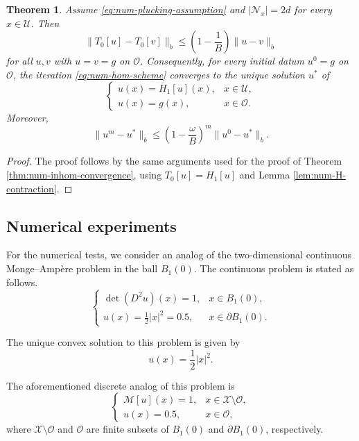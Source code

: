 \documentclass[reqno,11pt]{amsart}
\numberwithin{equation}{section}
\newtheorem{theorem}{Theorem}[section]
\theoremstyle{definition}
\theoremstyle{remark}
\begin{document}
\begin{theorem}\label{thm:num-hom-convergence}
Assume \eqref{eq:num-plucking-assumption} and \(|\mathcal N_x|=2d\) for every \(x\in \mathcal{U}\). Then
\[
    \|T_0[u]-T_0[v]\|_b
    \le
    \left(1-\frac1B\right)\|u-v\|_b
\]
for all \(u,v\) with \(u=v=g\) on \(\mathcal O\). Consequently, for every initial datum \(u^0=g\) on \(\mathcal O\), the iteration \eqref{eq:num-hom-scheme} converges to the unique solution \(u^\ast\) of
\[
    \begin{cases}
    u(x)=H_1[u](x),
    &x\in \mathcal{U},\\
    u(x)=g(x),
    &x\in\mathcal O.
    \end{cases}
\]
Moreover,
\[
    \|u^m-u^\ast\|_b
    \le
    \left(1-\frac{\omega}{B}\right)^m
    \|u^0-u^\ast\|_b .
\]
\end{theorem}

\begin{proof}
The proof follows by the same arguments used for the proof of Theorem \ref{thm:num-inhom-convergence}, using \(T_0[u]=H_1[u]\) and Lemma \ref{lem:num-H-contraction}.
\end{proof}

\subsection{Numerical experiments}

For the numerical tests, we consider an analog of the two-dimensional continuous Monge--Amp\`ere problem in the ball $B_1(0)$. The continuous problem is stated as follows.
\[
    \begin{cases}
        \det (D^2 u)(x) =1, & x\in B_1(0),\\
        u(x)=\frac{1}{2}|x|^2=0.5, & x\in \partial B_1(0).
    \end{cases}
\]

The unique convex solution to this problem is given by $$u(x) = \frac{1}{2}|x|^2.$$

The aforementioned discrete analog of this problem is
\begin{equation}\label{eq:numerical-test-equations}
    \begin{cases}
        \mathcal{M}[u](x) =1, & x\in \mathcal{X}\setminus\mathcal{O},\\
        u(x)=0.5, & x\in \mathcal{O},
    \end{cases}
\end{equation}
where $\mathcal{X}\setminus\mathcal{O}$ and $\mathcal{O}$ are finite subsets of $B_1(0)$ and $\partial B_1(0)$, respectively.
 
\end{document}
